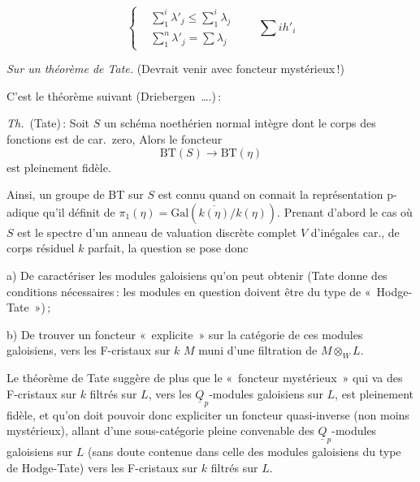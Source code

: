 \documentclass[11pt,a4paper]{article}
\begin{document}


\[
  \left\{
  \begin{aligned}
    &\textstyle\sum_1^i \lambda'_j \leq \sum_1^i \lambda_j \\
    &\textstyle\sum_1^n \lambda'_j = \sum \lambda_j
  \end{aligned}
  \right.
  \qquad \textstyle\sum i h'_i
\]

\emph{Sur un théorème de Tate.} (Devrait venir avec foncteur mystérieux\,!)

C'est le théorème suivant (Driebergen~….)\,:

\emph{Th.}\ (Tate)\,: Soit $S$ un schéma noethérien normal intègre dont le corps des fonctions  est de car.\ zero, Alors le foncteur
\[
  \mathrm{BT}(S) \longrightarrow \mathrm{BT}(\eta)
\]
est pleinement fidèle.

Ainsi, un groupe de BT sur $S$ est connu  quand on connait la représentation p-adique qu'il définit de $\pi_1(\eta) = \mathrm{Gal}(\overline{k(\eta)}/k(\eta))$. Prenant d'abord le cas où $S$ est le spectre d'un anneau de valuation discrète complet $V$ d'inégales car., de corps  résiduel $k$ parfait, la question se pose donc

a) De caractériser les modules galoisiens qu'on peut obtenir (Tate donne des conditions nécessaires\,: les modules en question doivent être du type de «~Hodge-Tate~»)\,;

b) De trouver un foncteur «~explicite~» sur la catégorie de ces modules galoisiens, vers les F-cristaux sur $k$ $M$ muni d'une filtration de $M \otimes_W L$.

 Le théorème de Tate suggère de plus que le «~foncteur mystérieux~» qui va des F-cristaux sur $k$ filtrés sur $L$, vers les $\underline{Q}_p$-modules galoisiens sur $L$, est pleinement fidèle, et qu'on doit pouvoir donc  expliciter un foncteur quasi-inverse (non moins mystérieux), allant d'une sous-catégorie pleine convenable des $\underline{Q}_p$-modules galoisiens sur $L$ (sans doute contenue dans celle des modules galoisiens du type de Hodge-Tate) vers les F-cristaux sur $k$ filtrés sur $L$.
\end{document}
